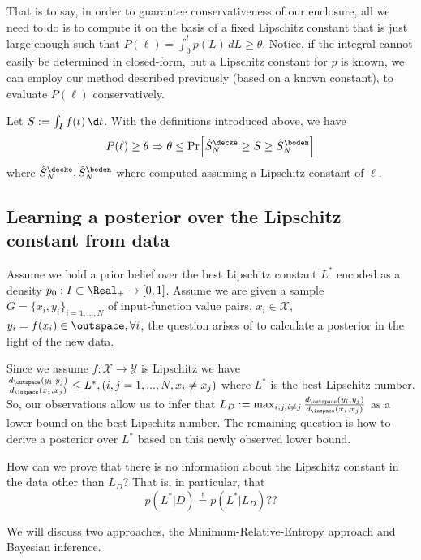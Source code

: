That is to say, in order to guarantee conservativeness of our enclosure, all we need to do is to compute it on the basis of 
a fixed Lipschitz constant that is just large enough such that $P(\ell) = \int_0^l p(L) \,dL \geq \theta$. Notice, if the integral cannot easily be determined in closed-form, but a Lipschitz constant for $p$ is known, we can employ our method described previously (based on a known constant), to evaluate $P(\ell)$ conservatively. 

\begin{cor}
Let $S := \int_I f(t) \, \d t$. 
With the definitions introduced above, we have  \[P(\ell) \geq \theta \Rightarrow \theta \leq \Pr\Bigl[ \hat S^\decke_N \geq S \geq \hat S^\boden_N  \Bigr]  \] 
where $\hat S^\decke_N , \hat S^\boden_N $ where computed assuming a Lipschitz constant of $\ell$.

\end{cor}

\subsection{Learning a posterior over the Lipschitz constant from data}

Assume we hold a prior belief over the best Lipschitz constant $L^*$ encoded as a density $p_0 : I \subset \Real_+ \to [0,1]$.
Assume we are given a sample $G = \{x_i,y_i\}_{i=1,...,N}$ of input-function value pairs, $x_i \in \mathcal X$, $y_i = f(x_i) \in \outspace, \forall i$, the question arises of to calculate a posterior in the light of the new data. 

Since we assume $f :\mathcal X \to \mathcal Y$ is Lipschitz we have $ \frac{d_\outspace(y_i,y_j)}{d_{\inspace}(x_i,x_j)} \leq L^*,  (i,j =1,...,N, x_i \neq x_j)$ where $L^*$ is the best Lipschitz number. So, our observations allow us to infer that $L_D := \max_{i,j,i\neq j} \frac{d_\outspace(y_i,y_j)}{d_{\inspace}(x_i,x_j)} $ as a lower bound on the best Lipschitz number. 
The remaining question is how to derive a posterior over $L^*$ based on this newly observed lower bound. 

\begin{ques}
How can we prove that there is no information about the Lipschitz constant in the data other than $L_D$? That is, in particular, that \[p(L^*|D) \stackrel{!}{=}p(L^* |L_D) ??\]
\end{ques}


We will discuss two approaches, the Minimum-Relative-Entropy approach and Bayesian inference.

